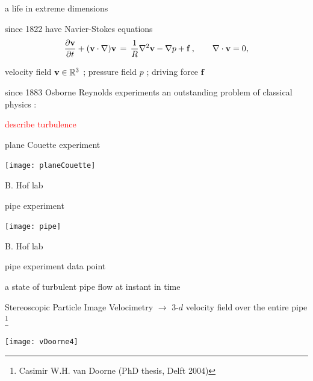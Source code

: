 \begin{frame}{a life in extreme dimensions}
\begin{block}{since 1822 have Navier-Stokes equations}
\[
\dfrac{\partial {\bf v}}{\partial t} + ({\bf v} \cdot \nabla) {\bf v}
	\,=\,
\frac{1}{R} \nabla ^2 {\bf v}
-\nabla p
+ \mathbf{f}
    \,,\qquad
\nabla \cdot {\bf v} = 0,
\]
\end{block}

\hfill{\small
velocity field  ${\bf v} \in \mathbb{R}^3$
;
pressure field $p$
;
driving force $\mathbf{f}$
        }

\medskip

\begin{block}{since  1883 Osborne Reynolds experiments}
an outstanding problem of classical physics :
\end{block}

\bigskip

\hfill {\Large\textcolor{red}{describe turbulence}}

\end{frame}

\begin{frame}{plane Couette experiment}
\begin{center}
\texttt{[image: planeCouette]}
\end{center}
B. Hof lab
\end{frame}

\begin{frame}{pipe experiment}
\begin{center}
\texttt{[image: pipe]}
\end{center}
B. Hof lab
\end{frame}

\begin{frame}{pipe experiment data point}
\begin{block}{a state of turbulent pipe flow at instant in time}
\end{block}

\bigskip

Stereoscopic Particle Image Velocimetry $\to$
3-$d$ velocity field over the entire pipe%
\footnote{
Casimir W.H. van Doorne
(PhD thesis, Delft  2004)
}

\bigskip

\begin{center}
\texttt{[image: vDoorne4]}
\end{center}
\end{frame}


